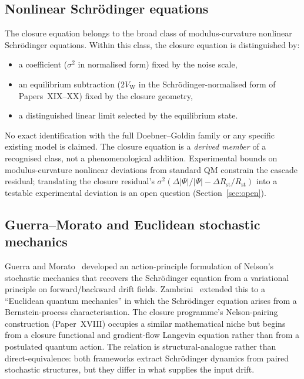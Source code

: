 \documentclass[12pt]{article}
\newcommand{\VW}{V_{\mathrm{W}}}
\begin{document}
\subsection{Nonlinear Schr\"odinger equations}

The closure equation belongs to the broad class of modulus-curvature nonlinear Schr\"odinger equations. Within this class, the closure equation is distinguished by:
\begin{itemize}
    \item a coefficient ($\sigma^2$ in normalised form) fixed by the noise scale,
    \item an equilibrium subtraction ($2\VW$ in the Schr\"odinger-normalised form of Papers~XIX--XX) fixed by the closure geometry,
    \item a distinguished linear limit selected by the equilibrium state.
\end{itemize}

No exact identification with the full Doebner--Goldin family \citep{DoebnerGoldin1996} or any specific existing model is claimed. The closure equation is a \textit{derived member} of a recognised class, not a phenomenological addition. Experimental bounds on modulus-curvature nonlinear deviations from standard QM \citep{BialynickiBirulaMycielski1976,WeinbergNonlinear1989,BollingerHeinzenItano1989} constrain the cascade residual; translating the closure residual's $\sigma^2 (\Delta|\Psi|/|\Psi| - \Delta R_{\mathrm{st}}/R_{\mathrm{st}})$ into a testable experimental deviation is an open question (Section~\ref{sec:open}).

\subsection{Guerra--Morato and Euclidean stochastic mechanics}

Guerra and Morato~\citep{GuerraMorato1983} developed an action-principle formulation of Nelson's stochastic mechanics that recovers the Schr\"odinger equation from a variational principle on forward/backward drift fields. Zambrini~\citep{Zambrini1986} extended this to a ``Euclidean quantum mechanics'' in which the Schr\"odinger equation arises from a Bernstein-process characterisation. The closure programme's Nelson-pairing construction (Paper~XVIII) occupies a similar mathematical niche but begins from a closure functional and gradient-flow Langevin equation rather than from a postulated quantum action. The relation is structural-analogue rather than direct-equivalence: both frameworks extract Schr\"odinger dynamics from paired stochastic structures, but they differ in what supplies the input drift.
\end{document}

